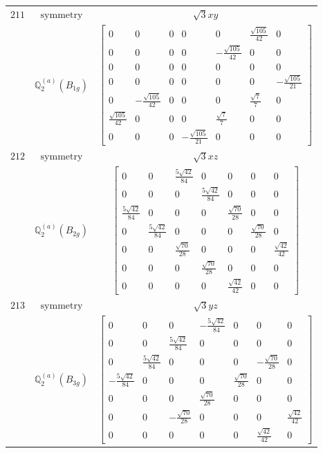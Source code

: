 \documentclass[fleqn,8pt,landscape]{jsarticle}
\begin{document}
\begin{longtable}{ccc}
$ 211 $ & $ \text{symmetry} $ & $ \sqrt{3} x y $ \\
$  $ & $ \mathbb{Q}_{2}^{(a)}(B_{1g}) $ & $ \begin{bmatrix} 0 & 0 & 0 & 0 & 0 & \frac{\sqrt{105}}{42} & 0 \\ 0 & 0 & 0 & 0 & - \frac{\sqrt{105}}{42} & 0 & 0 \\ 0 & 0 & 0 & 0 & 0 & 0 & 0 \\ 0 & 0 & 0 & 0 & 0 & 0 & - \frac{\sqrt{105}}{21} \\ 0 & - \frac{\sqrt{105}}{42} & 0 & 0 & 0 & \frac{\sqrt{7}}{7} & 0 \\ \frac{\sqrt{105}}{42} & 0 & 0 & 0 & \frac{\sqrt{7}}{7} & 0 & 0 \\ 0 & 0 & 0 & - \frac{\sqrt{105}}{21} & 0 & 0 & 0 \end{bmatrix} $ \\ \hline
$ 212 $ & $ \text{symmetry} $ & $ \sqrt{3} x z $ \\
$  $ & $ \mathbb{Q}_{2}^{(a)}(B_{2g}) $ & $ \begin{bmatrix} 0 & 0 & \frac{5 \sqrt{42}}{84} & 0 & 0 & 0 & 0 \\ 0 & 0 & 0 & \frac{5 \sqrt{42}}{84} & 0 & 0 & 0 \\ \frac{5 \sqrt{42}}{84} & 0 & 0 & 0 & \frac{\sqrt{70}}{28} & 0 & 0 \\ 0 & \frac{5 \sqrt{42}}{84} & 0 & 0 & 0 & \frac{\sqrt{70}}{28} & 0 \\ 0 & 0 & \frac{\sqrt{70}}{28} & 0 & 0 & 0 & \frac{\sqrt{42}}{42} \\ 0 & 0 & 0 & \frac{\sqrt{70}}{28} & 0 & 0 & 0 \\ 0 & 0 & 0 & 0 & \frac{\sqrt{42}}{42} & 0 & 0 \end{bmatrix} $ \\ \hline
$ 213 $ & $ \text{symmetry} $ & $ \sqrt{3} y z $ \\
$  $ & $ \mathbb{Q}_{2}^{(a)}(B_{3g}) $ & $ \begin{bmatrix} 0 & 0 & 0 & - \frac{5 \sqrt{42}}{84} & 0 & 0 & 0 \\ 0 & 0 & \frac{5 \sqrt{42}}{84} & 0 & 0 & 0 & 0 \\ 0 & \frac{5 \sqrt{42}}{84} & 0 & 0 & 0 & - \frac{\sqrt{70}}{28} & 0 \\ - \frac{5 \sqrt{42}}{84} & 0 & 0 & 0 & \frac{\sqrt{70}}{28} & 0 & 0 \\ 0 & 0 & 0 & \frac{\sqrt{70}}{28} & 0 & 0 & 0 \\ 0 & 0 & - \frac{\sqrt{70}}{28} & 0 & 0 & 0 & \frac{\sqrt{42}}{42} \\ 0 & 0 & 0 & 0 & 0 & \frac{\sqrt{42}}{42} & 0 \end{bmatrix} $ \\ \hline

\end{longtable}
\end{document}
